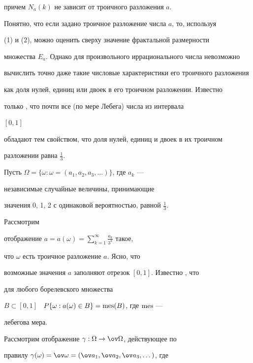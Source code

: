 причем $N_a(k)$ не зависит от троичного разложения $a$. 


 


Понятно, что если задано троичное разложение числа $a$, то, используя 


(1) и (2), можно оценить сверху значение фрактальной размерности 


множества $E_a$. Однако для произвольного иррационального числа невозможно 


вычислить точно даже такие числовые характеристики его троичного разложения 


как доля нулей, единиц или двоек в его троичном разложении. Известно 


только \cite{7}, что почти все (по мере Лебега) числа из интервала 


$[0,1]$ 


обладают тем свойством, что доля нулей, единиц и двоек в их троичном 


разложении равна $\frac{1}{3}$. 


 


Пусть $\Omega=\{\omega:\omega=(a_1,a_2,a_3,\dotsc)\}$, где $a_k$ --- 


независимые случайные величины, принимающие 


значения 0, 1, 2 с одинаковой вероятностью, равной $\frac{1}{3}$. 


Рассмотрим 


отображение $a=a(\omega)=\sum\limits^\infty_{k=1}\frac{a_k}{3^k}$ такое, 


что $\omega$ есть троичное разложение $a$. Ясно, что 


возможные значения $a$ заполняют отрезок $[0,1]$. Известно \cite{7}, что 


для любого борелевского множества 


$B\subset[0,1]$ \ $P\{\omega:a(\omega)\in B\}=\operatorname{mes}(B)$, где $\operatorname{mes}$ --- 


лебегова мера. 


 


Рассмотрим отображение $\gamma:\Omega\to\ov\Omega$, действующее по 


правилу $\gamma(\omega)=\ov\omega=(\ov a_1,\ov a_2,\ov a_3,\dotsc)$, где 


